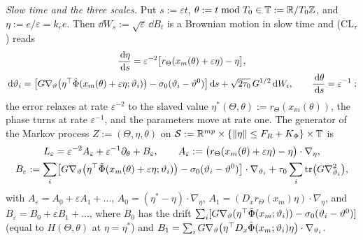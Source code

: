 \smallskip
\noindent\emph{Slow time and the three scales.} Put $s := \varepsilon t$, $\theta := t \bmod T_0\in\mathbb{T} :=
\mathbb{R}/T_0\mathbb{Z}$, and $\eta := e/\varepsilon = k_ee$. Then $\dd W_s := \sqrt\varepsilon\,\dd B_t$ is a Brownian
motion in slow time and (CL$_\tau$) reads
\begin{gather*}
  \frac{\,\mathrm{d}\eta}{\,\mathrm{d} s} = \varepsilon^{-2}\bigl[r_\Theta(x_m(\theta) + \varepsilon\eta) - \eta\bigr],\\
  \,\mathrm{d}\vartheta_i = \bigl[G\nabla_\vartheta\bigl(\eta^\top\tilde\Phi(x_m(\theta) + \varepsilon\eta;\vartheta_i)\bigr)
  - \sigma_0(\vartheta_i - \vartheta^0)\bigr]\,\mathrm{d} s + \sqrt{2\tau_0}\,G^{1/2}\,\mathrm{d} W_i,\qquad
  \frac{\,\mathrm{d}\theta}{\,\mathrm{d} s} = \varepsilon^{-1}:
\end{gather*}
the error relaxes at rate $\varepsilon^{-2}$ to the slaved value $\eta^*(\Theta,\theta) := r_\Theta(x_m(\theta))$,
the phase turns at rate $\varepsilon^{-1}$, and the parameters move at rate one. The generator of the Markov process
$Z := (\Theta,\eta,\theta)$ on $\mathcal{S} := \mathbb{R}^{mp}\times\{\lVert \eta\rVert\le F_R + K_\Phi\}\times\mathbb{T}$ is
\begin{gather*}
  L_\varepsilon = \varepsilon^{-2}A_\varepsilon + \varepsilon^{-1}\partial_\theta + B_\varepsilon,\qquad
  A_\varepsilon := \bigl(r_\Theta(x_m(\theta) + \varepsilon\eta) - \eta\bigr)\cdot\nabla_\eta,\\
  B_\varepsilon := \sum_i\bigl[G\nabla_\vartheta\bigl(\eta^\top\tilde\Phi(x_m(\theta) + \varepsilon\eta;\vartheta_i)\bigr)
  - \sigma_0(\vartheta_i - \vartheta^0)\bigr]\cdot\nabla_{\vartheta_i} + \tau_0\sum_i\operatorname{tr}\bigl(G\nabla^2_{\vartheta_i}\bigr),
\end{gather*}
with $A_\varepsilon = A_0 + \varepsilon A_1 + \dots$, $A_0 = (\eta^* - \eta)\cdot\nabla_\eta$,
$A_1 = (D_xr_\Theta(x_m)\eta)\cdot\nabla_\eta$, and $B_\varepsilon = B_0 + \varepsilon B_1 + \dots$, where $B_0$ has
the drift $\sum_i[G\nabla_\vartheta(\eta^\top\tilde\Phi(x_m;\vartheta_i)) - \sigma_0(\vartheta_i - \vartheta^0)]$
(equal to $H(\Theta,\theta)$ at $\eta = \eta^*$) and
$B_1 = \sum_iG\nabla_\vartheta\bigl(\eta^\top D_x\tilde\Phi(x_m;\vartheta_i)\eta\bigr)\cdot\nabla_{\vartheta_i}$.

